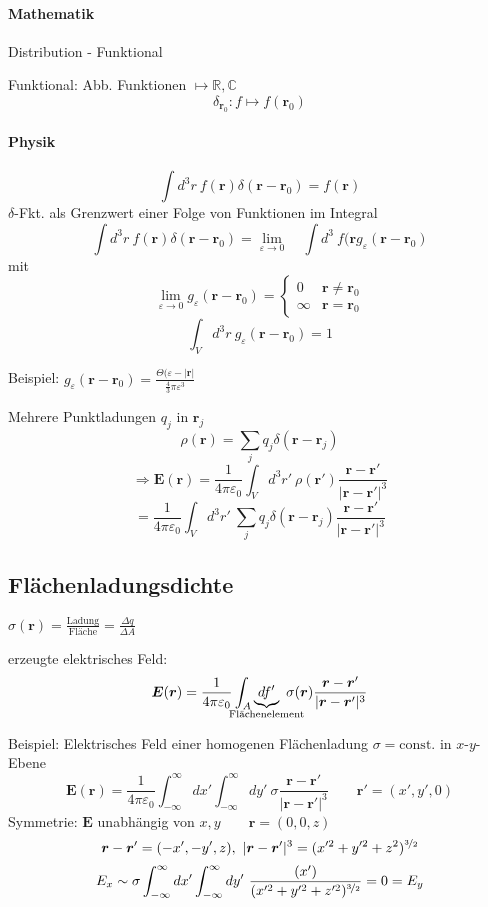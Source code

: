 \documentclass[titlepage,11pt,a4paper,ngerman]{report}
\newcommand{\tx}[1]{\textrm{#1}}
\newcommand{\const}{\tx{const.}}
\newcommand{\kq}{\frac{1}{4\pi\epsilon_0}}
\newcommand{\intt}[2]{\int_{#1}^{#2}}
\renewcommand{\vec}[1]{\boldsymbol{#1}}
\renewcommand{\epsilon}{\varepsilon}
\begin{document}


\paragraph{Mathematik}
Distribution - Funktional

Funktional: Abb. Funktionen $\mapsto \mathbb R, \mathbb C$
$$\delta_{\vec{r}_0}: f \mapsto f(\vec{r}_0)$$

\paragraph{Physik}

$$\int d^3 r\ f(\vec{r}) \delta (\vec{r}-\vec{r}_0) = f(\vec{r})$$
$\delta$-Fkt. als Grenzwert einer Folge von Funktionen im Integral
$$\int d^3 r\ f(\vec{r}) \delta (\vec{r} - \vec{r}_0) = \lim_{\epsilon \to 0} \quad \int d^3\ f(\vec{r} g_\epsilon(\vec{r}-\vec{r}_0) $$
mit
$$\lim_{\epsilon \to 0} g_\epsilon (\vec{r}-\vec{r}_0) =  \left\{ \begin{array}{cc}
0 & \vec{r} \neq \vec{r}_0 \\
\infty & \vec{r} = \vec{r}_0
\end{array}\right.$$
$$\int_V d^3 r\ g_\epsilon (\vec{r}-\vec{r}_0) = 1$$

Beispiel: $g_\epsilon (\vec{r}-\vec{r}_0) = \frac{\Theta(\epsilon - |\vec{r}|}{\frac{4}{3}\pi \epsilon^3}$

Mehrere Punktladungen $q_j$ in $\vec{r}_j$
$$\rho(\vec{r}) = \sum_j q_j \delta(\vec{r}-\vec{r}_j)$$
$$\Rightarrow \vec{E}(\vec{r}) = \kq \int_V d^3 r'\ \rho(\vec{r}') \frac{\vec{r} - \vec{r}'}{|\vec{r} - \vec{r}'|^3}$$
$$= \kq \int_V d^3 r'\ \sum_j q_j \delta(\vec{r} - \vec{r}_j) \frac{\vec{r} - \vec{r}'}{|\vec{r} - \vec{r}'|^3}$$

\subsection{Flächenladungsdichte}

$\sigma(\vec{r}) = \frac{\textrm{Ladung}}{\textrm{Fläche}} = \frac{\Delta q}{\Delta A}$

erzeugte elektrisches Feld:
$$\vec{E}(\vec{r}) = \kq \int_A \underbrace{df'}_{\mathclap{\textrm{Flächenelement}}}\ \sigma (\vec{r}) \frac{\vec{r} - \vec{r}'}{|\vec{r} - \vec{r}'|^3}$$

Beispiel: Elektrisches Feld einer homogenen Flächenladung
$\sigma = \const$ in $x$-$y$-Ebene
$$\vec{E}(\vec{r}) = \kq \intt{-\infty}{\infty}dx'\intt{-\infty}{\infty}dy'\ \sigma \frac{\vec{r} - \vec{r}'}{|\vec{r} - \vec{r}'|^3} \qquad \vec{r}' = (x', y', 0)$$
Symmetrie: $\vec{E}$ unabhängig von $x,y \qquad \vec{r} = (0,0,z)$
$$\vec{r} - \vec{r}' = (-x',-y',z),\ |\vec{r} - \vec{r}'|^3 = (x'^2+y'^2+z^2)^{\nicefrac{3}{2}}$$
$$E_x \sim \sigma \intt{-\infty}{\infty}dx'\intt{-\infty}{\infty}dy'\ \frac{(x')}{(x'^2 + y'^2 + z'^2)^{\nicefrac{3}{2}}} = 0 = E_y$$
\end{document}
